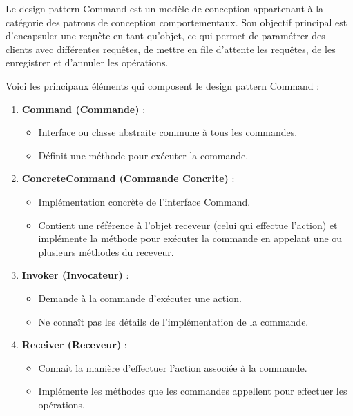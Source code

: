\documentclass[french]{article}
\begin{document}
Le design pattern Command est un modèle de conception appartenant à la catégorie des patrons de conception comportementaux. Son objectif principal est d'encapsuler une requête en tant qu'objet, ce qui permet de paramétrer des clients avec différentes requêtes, de mettre en file d'attente les requêtes, de les enregistrer et d'annuler les opérations.

Voici les principaux éléments qui composent le design pattern Command :

\begin{enumerate}
    \item \textbf{Command (Commande)} :
    \begin{itemize}
        \item Interface ou classe abstraite commune à tous les commandes.
        \item Définit une méthode pour exécuter la commande.
    \end{itemize}
    
    \item \textbf{ConcreteCommand (Commande Concrite)} :
    \begin{itemize}
        \item Implémentation concrète de l'interface Command.
        \item Contient une référence à l'objet receveur (celui qui effectue l'action) et implémente la méthode pour exécuter la commande en appelant une ou plusieurs méthodes du receveur.
    \end{itemize}
    
    \item \textbf{Invoker (Invocateur)} :
    \begin{itemize}
        \item Demande à la commande d'exécuter une action.
        \item Ne connaît pas les détails de l'implémentation de la commande.
    \end{itemize}
    
    \item \textbf{Receiver (Receveur)} :
    \begin{itemize}
        \item Connaît la manière d'effectuer l'action associée à la commande.
        \item Implémente les méthodes que les commandes appellent pour effectuer les opérations.
    \end{itemize}
\end{enumerate}
\end{document}
